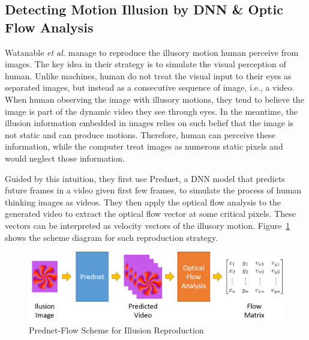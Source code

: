 \documentclass[journal]{IEEEtran}
\begin{document}
  \subsection{Detecting Motion Illusion by DNN \& Optic Flow Analysis}
  \label{sec:detection_dnn}
  Watanable \textit{et al.} \cite{watanable2018illusory} manage to reproduce the illusory motion human perceive from images.
  The key idea in their strategy is to simulate the visual perception of human.
  Unlike machines, human do not treat the visual input to their eyes as separated images, but instead as a consecutive sequence of image, i.e., a video.
  When human observing the image with illusory motions, they tend to believe the image is part of the dynamic video they see through eyes.
  In the meantime, the illusion information embedded in images relies on such belief that the image is not static and can produce motions.
  Therefore, human can perceive these information, while the computer treat images as numerous static pixels and would neglect those information.
  
  Guided by this intuition, they first use Prednet, a DNN model that predicts future frames in a video given first few frames, to simulate the process of human thinking images as videos.
  They then apply the optical flow analysis to the generated video to extract the optical flow vector at some critical pixels.
  These vectors can be interpreted as velocity vectors of the illusory motion.
  Figure~\ref{fig:scheme} shows the scheme diagram for such reproduction strategy.
  
  \begin{figure}[t]
    \centering
    \includegraphics[width=\linewidth]{fig/pred-flow-procedure.png}
    \caption{Prednet-Flow Scheme for Illusion Reproduction}
    \label{fig:scheme}
  \end{figure}
  
  
\end{document}
